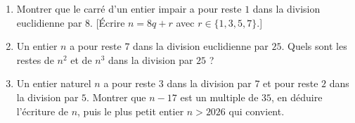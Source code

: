 
\begin{enumerate}
  \item Montrer que le carré d'un entier impair a pour reste $1$ dans la division euclidienne par $8$. [Écrire $n=8q+r$ avec $r\in\{1,3,5,7\}$.]
  \item Un entier $n$ a pour reste $7$ dans la division euclidienne par $25$. Quels sont les restes de $n^2$ et de $n^3$ dans la division par $25$ ?
  \item Un entier naturel $n$ a pour reste $3$ dans la division par $7$ et pour reste $2$ dans la division par $5$. Montrer que $n-17$ est un multiple de $35$, en déduire l'écriture de $n$, puis le plus petit entier $n>2026$ qui convient.
\end{enumerate}

